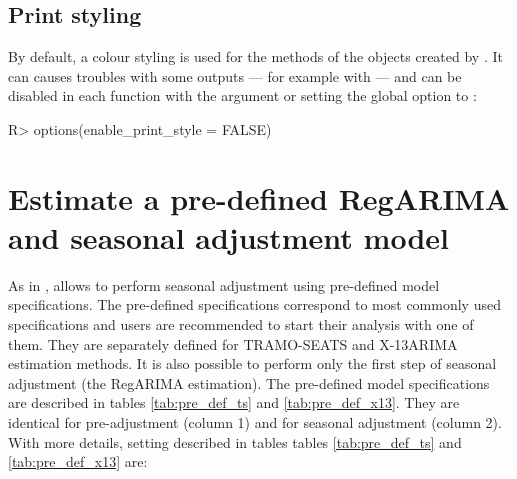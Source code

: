 \documentclass[article]{jss}
\begin{document}
\hypertarget{print-styling}{%
\subsection{Print styling}\label{print-styling}}

By default, a colour styling is used for the  methods of the
objects created by . It can causes troubles with some
outputs --- for example with  \citep{rmarkdown} --- and
can be disabled in each  function with the argument
 or setting the global option
 to :

\begin{CodeChunk}

\begin{CodeInput}
R> options(enable_print_style = FALSE)
\end{CodeInput}
\end{CodeChunk}

\hypertarget{pre-def-est}{%
\section{Estimate a pre-defined RegARIMA and seasonal adjustment
model}\label{pre-def-est}}

As in ,  allows to perform seasonal
adjustment using pre-defined model specifications. The pre-defined
specifications correspond to most commonly used specifications and users
are recommended to start their analysis with one of them. They are
separately defined for TRAMO-SEATS and X-13ARIMA estimation methods. It
is also possible to perform only the first step of seasonal adjustment
(the RegARIMA estimation). The pre-defined model specifications are
described in tables \ref{tab:pre_def_ts} and \ref{tab:pre_def_x13}. They
are identical for pre-adjustment (column 1) and for seasonal adjustment
(column 2). With more details, setting described in tables tables
\ref{tab:pre_def_ts} and \ref{tab:pre_def_x13} are:
\end{document}

